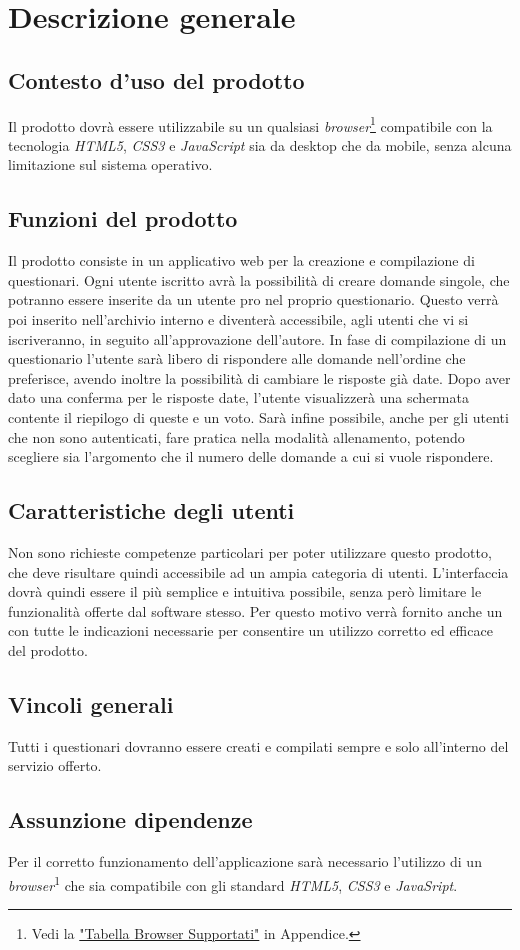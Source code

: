\newpage
\section{Descrizione generale}
\subsection{Contesto d'uso del prodotto}
Il prodotto dovrà essere utilizzabile su un qualsiasi \textit{browser}\footnote[1]{Vedi la \hyperref[TBS1]{"Tabella Browser Supportati"} in Appendice.} compatibile con la tecnologia \textit{HTML5}, \textit{CSS3} e \textit{JavaScript} sia da desktop che da mobile, senza alcuna limitazione sul sistema operativo.

\subsection{Funzioni del prodotto}
Il prodotto consiste in un applicativo web per la creazione e compilazione di questionari. Ogni utente iscritto avrà la possibilità di creare domande singole, che potranno essere inserite da un utente pro nel proprio questionario. Questo verrà poi inserito nell'archivio interno e diventerà accessibile, agli utenti che vi si iscriveranno, in seguito all'approvazione dell'autore. In fase di compilazione di un questionario l'utente sarà libero di rispondere alle domande nell'ordine che preferisce, avendo inoltre la possibilità di cambiare le risposte già date. Dopo aver dato una conferma per le risposte date, l'utente visualizzerà una schermata contente il riepilogo di queste e un voto. Sarà infine possibile, anche per gli utenti che non sono autenticati, fare pratica nella modalità allenamento, potendo scegliere sia l'argomento che il numero delle domande a cui si vuole rispondere.

\subsection{Caratteristiche degli utenti}
Non sono richieste competenze particolari per poter utilizzare questo prodotto, che deve risultare quindi accessibile ad un ampia categoria di utenti. L'interfaccia dovrà quindi essere il più semplice e intuitiva possibile, senza però limitare le funzionalità offerte dal software stesso. Per questo motivo verrà fornito anche un \textit{\MU} con tutte le indicazioni necessarie per consentire un utilizzo corretto ed efficace del prodotto.
\subsection{Vincoli generali}
Tutti i questionari dovranno essere creati e compilati sempre e solo all'interno del servizio offerto.
\subsection{Assunzione dipendenze}
Per il corretto funzionamento dell'applicazione sarà necessario l'utilizzo di un \textit{browser}\textsuperscript{1} che sia compatibile con gli standard \textit{HTML5}, \textit{CSS3} e \textit{JavaSript}.
